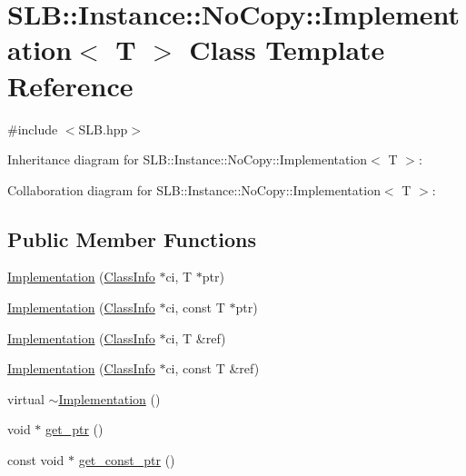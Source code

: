 \hypertarget{classSLB_1_1Instance_1_1NoCopy_1_1Implementation}{}\section{S\+LB\+:\+:Instance\+:\+:No\+Copy\+:\+:Implementation$<$ T $>$ Class Template Reference}
\label{classSLB_1_1Instance_1_1NoCopy_1_1Implementation}


{\ttfamily \#include $<$S\+L\+B.\+hpp$>$}



Inheritance diagram for S\+LB\+:\+:Instance\+:\+:No\+Copy\+:\+:Implementation$<$ T $>$\+:


Collaboration diagram for S\+LB\+:\+:Instance\+:\+:No\+Copy\+:\+:Implementation$<$ T $>$\+:
\subsection*{Public Member Functions}
\begin{DoxyCompactItemize}
\item 
\hyperlink{classSLB_1_1Instance_1_1NoCopy_1_1Implementation_ac040f5fc4e0a48d847303c868b16d584}{Implementation} (\hyperlink{classSLB_1_1ClassInfo}{Class\+Info} $\ast$ci, T $\ast$ptr)
\item 
\hyperlink{classSLB_1_1Instance_1_1NoCopy_1_1Implementation_a03d4fa6e94c69196d851d6994ace2af4}{Implementation} (\hyperlink{classSLB_1_1ClassInfo}{Class\+Info} $\ast$ci, const T $\ast$ptr)
\item 
\hyperlink{classSLB_1_1Instance_1_1NoCopy_1_1Implementation_a21da3d2f652b819b9b40cf745caabb2a}{Implementation} (\hyperlink{classSLB_1_1ClassInfo}{Class\+Info} $\ast$ci, T \&ref)
\item 
\hyperlink{classSLB_1_1Instance_1_1NoCopy_1_1Implementation_a5cba45ebcb53fed8dfdad9b0a380165e}{Implementation} (\hyperlink{classSLB_1_1ClassInfo}{Class\+Info} $\ast$ci, const T \&ref)
\item 
virtual \hyperlink{classSLB_1_1Instance_1_1NoCopy_1_1Implementation_a0da49cbb83de474d11b201d5be73851d}{$\sim$\+Implementation} ()
\item 
void $\ast$ \hyperlink{classSLB_1_1Instance_1_1NoCopy_1_1Implementation_a3513e5d5942291c85348e8b48cdf9528}{get\+\_\+ptr} ()
\item 
const void $\ast$ \hyperlink{classSLB_1_1Instance_1_1NoCopy_1_1Implementation_a557efe99511f6f792c66f936275a875d}{get\+\_\+const\+\_\+ptr} ()
\end{DoxyCompactItemize}
